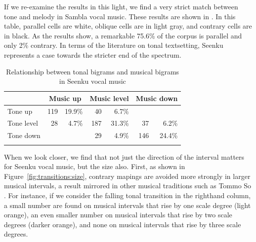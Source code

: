 \documentclass[output=paper]{langscibook}
\begin{document}
If we re-examine the results in this light, we find a very strict match between tone and melody in Sambla vocal music. These results are shown in . In this table, parallel cells are white, oblique cells are in light gray, and contrary cells are in black. As the results show, a remarkable 75.6\% of the corpus is parallel and only 2\% contrary. In terms of the literature on tonal textsetting, Seenku represents a case towards the stricter end of the spectrum. 


\begin{table}[p]
  \caption{Relationship between tonal bigrams and musical bigrams in Seenku vocal music\label{tab:mcpherson:Relationship}}
   \begin{tabular}{l *{3}{rr}}
   \lsptoprule
    & \multicolumn{2}{c}{Music up} & \multicolumn{2}{c}{Music level} & \multicolumn{2}{c}{Music down}\\\midrule
    Tone up    & 119 & 19.9\% & \cellcolor{lightgray} 40  & \cellcolor{lightgray} 6.7\%  & \cellcolor{black}\color{white}{7}   & \cellcolor{black}\color{white}{1.7\%}\\
    Tone level & \cellcolor{lightgray} 28  & \cellcolor{lightgray} 4.7\%  & 187 & 31.3\% & \cellcolor{lightgray}37  & \cellcolor{lightgray}6.2\%\\
    Tone down   & \cellcolor{black}\color{white}{5}  & \cellcolor{black}\color{white}{0.8\%}  & \cellcolor{lightgray}29  & \cellcolor{lightgray}4.9\%  & 146 & 24.4\%\\
    \lspbottomrule
   \end{tabular}
\end{table} 


When we look closer, we find that not just the direction of the interval matters for Seenku vocal music, but the size also. First, as shown in Figure~\ref{fig:transitions:size}, contrary mapings are avoided more strongly in larger musical intervals, a result mirrored in other musical traditions such as Tommo So \citep{McPhersonRyan2018}. For instance, if we consider the falling tonal transition in the righthand column, a small number are found on musical intervals that rise by one scale degree (light orange), an even smaller number on musical intervals that rise by two scale degrees (darker orange), and none on musical intervals that rise by three scale degrees.
\end{document}
